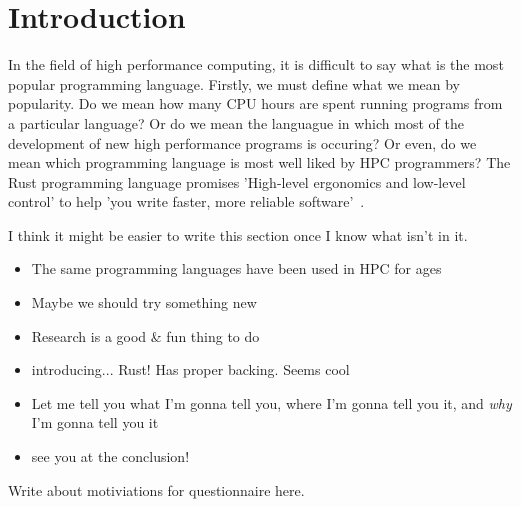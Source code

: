 \chapter{Introduction}
In the field of high performance computing, it is difficult to say what is the most popular programming language. Firstly, we must define what we mean by popularity. Do we mean how many CPU hours are spent running programs from a particular language? Or do we mean the languague in which most of the development of new high performance programs is occuring? Or even, do we mean which programming language is most well liked by HPC programmers?
The Rust programming language promises 'High-level ergonomics and low-level control' to help 'you write faster, more reliable software'~\cite{RustBook}.

I think it might be easier to write this section once I know what isn't in it.

\begin{itemize}
    \item The same programming languages have been used in HPC for ages
    \item Maybe we should try something new
    \item Research is a good \& fun thing to do
    \item introducing... Rust! Has proper backing. Seems cool
    \item Let me tell you what I'm gonna tell you, where I'm gonna tell you it, and \textit{why} I'm gonna tell you it
    \item see you at the conclusion!
\end{itemize}

Write about motiviations for questionnaire here.
